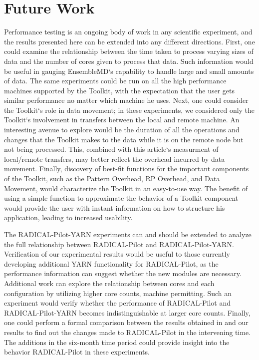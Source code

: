 \documentclass[]{article}
\begin{document}
\section{Future Work}
	Performance testing is an ongoing body of work in any scientific experiment, and the results presented here can be extended into any different directions. First, one could examine the relationship between the time taken to process varying sizes of data and the number of cores given to process that data. Such information would be useful in gauging EnsembleMD`s capability to handle large and small amounts of data. The same experiments could be run on all the high performance machines supported by the Toolkit, with the expectation that the user gets similar performance no matter which machine he uses. Next, one could consider the Toolkit`s role in data movement; in these experiments, we considered only the Toolkit`s involvement in transfers between the local and remote machine. An interesting avenue to explore would be the duration of all the operations and changes that the Toolkit makes to the data while it is on the remote node but not being processed. This, combined with this article`s measurment of local/remote transfers, may better reflect the overhead incurred by data movement. Finally, discovery of best-fit functions for the important components of the Toolkit, such as the Pattern Overhead, RP Overhead, and Data Movement, would characterize the Toolkit in an easy-to-use way. The benefit of using a simple function to approximate the behavior of a Toolkit component would provide the user with instant information on how to structure his application, leading to increased usability.

	The RADICAL-Pilot-YARN experiments can and should be extended to analyze the full relationship between RADICAL-Pilot and RADICAL-Pilot-YARN. Verification of our experimental results would be useful to those currently developing additional YARN functionality for RADICAL-Pilot, as the performance information can suggest whether the new modules are necessary. Additional work can explore the relationship between cores and each configuration by utilizing higher core counts, machine permitting. Such an experiment would verify whether the performance of RADICAL-Pilot and RADICAL-Pilot-YARN becomes indistinguishable at larger core counts. Finally, one could perform a formal comparison between the results obtained in \cite{hadoop_paper} and our results to find out the changes made to RADICAL-Pilot in the intervening time. The additions in the six-month time period could provide insight into the behavior RADICAL-Pilot in these experiments.
\end{document}
